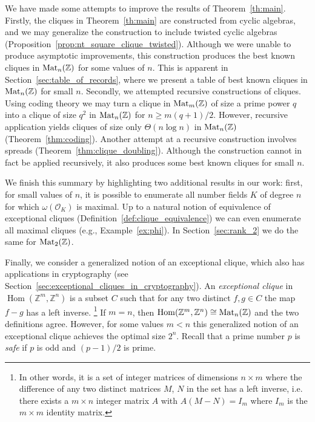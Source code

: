 \documentclass{amsart}
\theoremstyle{plain}
\theoremstyle{definition}
\DeclareMathOperator{\Hom}{Hom}
\newcommand{\Z}{\ensuremath{\mathbb{Z}}}
\newcommand{\clq}{C}
\begin{document}
We have made some attempts to improve the results of Theorem~\ref{th:main}.
Firstly, the cliques in Theorem~\ref{th:main} are constructed from cyclic algebras, and we may generalize the construction to include twisted cyclic algebras (Proposition~\ref{prop:nt_square_clique_twisted}).
Although we were unable to produce asymptotic improvements, this construction produces the best known cliques in \(\textup{Mat}_n(\Z)\) for some values of \(n\). This is apparent in Section~\ref{sec:table_of_records}, where we present a table of best known cliques in \(\textup{Mat}_n(\Z)\) for small \(n\).
Secondly, we attempted recursive constructions of cliques.
Using coding theory we may turn a clique in \(\textup{Mat}_m(\Z)\) of size a prime power \(q\) into a clique of size \(q^2\) in \(\textup{Mat}_{n}(\Z)\) for \(n\geq m(q+1)/2\).
However, recursive application yields cliques of size only \(\Theta(n\log n)\) in \(\textup{Mat}_n(\Z)\) (Theorem~\ref{thm:coding}).
Another attempt at a recursive construction involves spreads (Theorem~\ref{thm:clique_doubling}).
Although the construction cannot in fact be applied recursively, it also produces some best known cliques for small \(n\).

We finish this summary by highlighting two additional results in our work: first, for small values of \(n\), it is possible to enumerate all number fields \(K\) of degree \(n\) for which \(\omega(\mathcal{O}_K)\) is maximal.
Up to a natural notion of equivalence of exceptional cliques (Definition~\ref{def:clique_equivalence}) we can even enumerate all maximal cliques (e.g., Example~\ref{ex:phi}).
In Section~\ref{sec:rank_2} we do the same for \(\textup{Mat}_2(\Z)\).

Finally, we consider a generalized notion of an exceptional clique, which also has applications in cryptography (see Section~\ref{sec:exceptional_cliques_in_cryptography}). An \emph{exceptional clique} in \(\Hom(\Z^m,\Z^n)\) is a subset \(\clq\) such that for any two distinct \(f,g\in \clq\) the map \(f-g\) has a left inverse. \footnote{In other words, it is a set of integer matrices of dimensions $n\times m$ where the difference of any two distinct matrices $M$, $N$ in the set has a left inverse, i.e. there exists a $m\times n$ integer matrix $A$ with $A(M-N)=I_{m}$ where $I_m$ is the $m\times m$ identity matrix.} If \(m=n\), then \(\Hom(\Z^m,\Z^n)\cong\textup{Mat}_n(\Z)\) and the two definitions agree. However, for some values $m<n$ this generalized notion of an exceptional clique achieves the optimal size $2^n$. Recall that a prime number \(p\) is \emph{safe} if \(p\) is odd and \((p-1)/2\) is prime.
\end{document}
